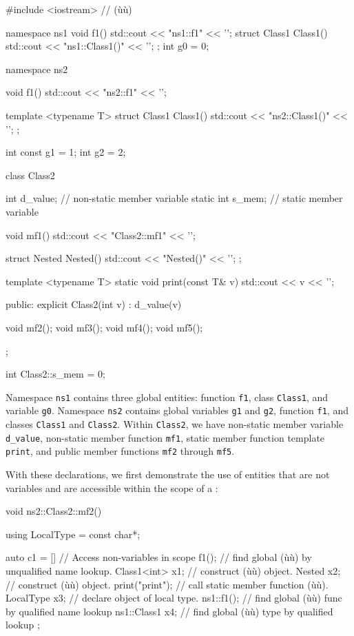 \begin{emcppslisting}
#include <iostream>  // (ù{}ù)

namespace ns1
{
    void f1() { std::cout << "ns1::f1" << '\n'; }
    struct Class1 { Class1() { std::cout << "ns1::Class1()" << '\n'; } };
    int g0 = 0;
}

namespace ns2
{
    void f1() { std::cout << "ns2::f1" << '\n'; }

    template <typename T>
    struct Class1 { Class1() { std::cout << "ns2::Class1()" << '\n'; } };

    int const g1 = 1;
    int       g2 = 2;

    class Class2
    {
        int        d_value;  // non-static member variable
        static int s_mem;    // static member variable

        void mf1() { std::cout << "Class2::mf1" << '\n'; }

        struct Nested { Nested() { std::cout << "Nested()" << '\n'; } };

        template <typename T>
        static void print(const T& v) { std::cout << v << '\n'; }

    public:
        explicit Class2(int v) : d_value(v) { }

        void mf2();
        void mf3();
        void mf4();
        void mf5();
    };

    int Class2::s_mem = 0;
}
\end{emcppslisting}
    

Namespace \lstinline!ns1! contains three global entities: function
\lstinline!f1!, class \lstinline!Class1!, and variable \lstinline!g0!. Namespace
\lstinline!ns2! contains global variables \lstinline!g1! and \lstinline!g2!,
function \lstinline!f1!, and classes \lstinline!Class1! and \lstinline!Class2!.
Within \lstinline!Class2!, we have non-static member variable
\lstinline!d_value!, non-static member function \lstinline!mf1!, static
member function template \lstinline!print!, and public member functions
\lstinline!mf2! through \lstinline!mf5!.

With these declarations, we first demonstrate the use of entities that
are not variables and are accessible within the scope of a
:

\begin{emcppslisting}
void ns2::Class2::mf2()
{
    using LocalType = const char*;

    auto c1 = []{
        // Access non-variables in scope
        f1();           // find global (ù{}ù) by unqualified name lookup.
        Class1<int> x1; // construct (ù{}ù) object.
        Nested      x2; // construct (ù{}ù) object.
        print("print"); // call static member function (ù{}ù).
        LocalType   x3; // declare object of local type.
        ns1::f1();      // find global (ù{}ù) func by qualified name lookup
        ns1::Class1 x4; // find global (ù{}ù) type by qualified lookup
    };
}
\end{emcppslisting}
    

